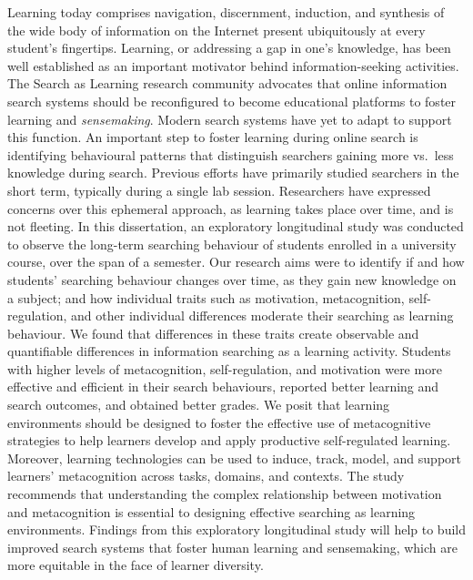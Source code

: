 \documentclass[letterpaper, nobind]{templates/ociamthesis}
\begin{document}
\begin{romanpages}
\begin{center}
\end{center}

\begin{spacing}{1.5}
  \indent
  Learning today comprises navigation, discernment, induction, and synthesis of the wide body of information on the Internet present ubiquitously at every student's fingertips.
  Learning, or addressing a gap in one's knowledge, has been well established as an important motivator behind information-seeking activities.
  The Search as Learning research community advocates that online information search systems should be reconfigured to become educational platforms to foster learning and \emph{sensemaking}.
  Modern search systems have yet to adapt to support this function.
  An important step to foster learning during online search is identifying behavioural patterns that distinguish searchers gaining more vs.~less knowledge during search.
  Previous efforts have primarily studied searchers in the short term, typically during a single lab session.
  Researchers have expressed concerns over this ephemeral approach, as learning takes place over time, and is not fleeting.
  In this dissertation, an exploratory longitudinal study was conducted to observe the long-term searching behaviour of students enrolled in a university course, over the span of a semester.
  Our research aims were to identify if and how students' searching behaviour changes over time, as they gain new knowledge on a subject; and how individual traits such as motivation, metacognition, self-regulation, and other individual differences moderate their searching as learning behaviour.
  We found that differences in these traits create observable and quantifiable differences in information searching as a learning activity.
  Students with higher levels of metacognition, self-regulation, and motivation were more effective and efficient in their search behaviours, reported better learning and search outcomes, and obtained better grades.
  We posit that learning environments should be designed to foster the effective use of metacognitive strategies to help learners develop and apply productive self-regulated learning.
  Moreover, learning technologies can be used to induce, track, model, and support learners' metacognition across tasks, domains, and contexts.
  The study recommends that understanding the complex relationship between motivation and metacognition is essential to designing effective searching as learning environments.
  Findings from this exploratory longitudinal study will help to build improved search systems that foster human learning and sensemaking, which are more equitable in the face of learner diversity.
\end{spacing}


\end{romanpages}
\end{document}
